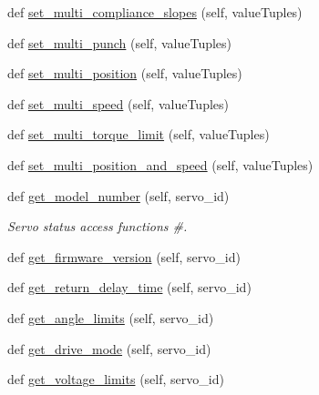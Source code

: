 \begin{DoxyCompactItemize}
def \hyperlink{classdynamixel__driver_1_1dynamixel__io_1_1_dynamixel_i_o_af3b2a4bd581266a9dd067a0c1f34687a}{set\+\_\+multi\+\_\+compliance\+\_\+slopes} (self, value\+Tuples)
\item 
def \hyperlink{classdynamixel__driver_1_1dynamixel__io_1_1_dynamixel_i_o_a113e6ff1c59d67480dc779fe7fa1ba52}{set\+\_\+multi\+\_\+punch} (self, value\+Tuples)
\item 
def \hyperlink{classdynamixel__driver_1_1dynamixel__io_1_1_dynamixel_i_o_aca2d90dab958dcc6d058c1eb6d7a6e11}{set\+\_\+multi\+\_\+position} (self, value\+Tuples)
\item 
def \hyperlink{classdynamixel__driver_1_1dynamixel__io_1_1_dynamixel_i_o_a8150f8a015df1441f348eb0a6c6ccaee}{set\+\_\+multi\+\_\+speed} (self, value\+Tuples)
\item 
def \hyperlink{classdynamixel__driver_1_1dynamixel__io_1_1_dynamixel_i_o_a1e05872bf62fd6726255c423219ca569}{set\+\_\+multi\+\_\+torque\+\_\+limit} (self, value\+Tuples)
\item 
def \hyperlink{classdynamixel__driver_1_1dynamixel__io_1_1_dynamixel_i_o_a124b89dc055f8f5ff807d8d976115529}{set\+\_\+multi\+\_\+position\+\_\+and\+\_\+speed} (self, value\+Tuples)
\item 
def \hyperlink{classdynamixel__driver_1_1dynamixel__io_1_1_dynamixel_i_o_a3f2d1b9ac285fb0490edfd2a4c7243c2}{get\+\_\+model\+\_\+number} (self, servo\+\_\+id)
\begin{DoxyCompactList}\small\item\em Servo status access functions \#. \end{DoxyCompactList}\item 
def \hyperlink{classdynamixel__driver_1_1dynamixel__io_1_1_dynamixel_i_o_a14d10031059c6c40dae76d3d9324a81c}{get\+\_\+firmware\+\_\+version} (self, servo\+\_\+id)
\item 
def \hyperlink{classdynamixel__driver_1_1dynamixel__io_1_1_dynamixel_i_o_a23eb8935d71b71c87fac075d8002abc1}{get\+\_\+return\+\_\+delay\+\_\+time} (self, servo\+\_\+id)
\item 
def \hyperlink{classdynamixel__driver_1_1dynamixel__io_1_1_dynamixel_i_o_af3a593697df035e17e287e3d401a8fe7}{get\+\_\+angle\+\_\+limits} (self, servo\+\_\+id)
\item 
def \hyperlink{classdynamixel__driver_1_1dynamixel__io_1_1_dynamixel_i_o_ad81c7f3da8654306f00f7ad9a2cbf54c}{get\+\_\+drive\+\_\+mode} (self, servo\+\_\+id)
\item 
def \hyperlink{classdynamixel__driver_1_1dynamixel__io_1_1_dynamixel_i_o_ab11d3c841d1e858f350c2c2e32f10ec3}{get\+\_\+voltage\+\_\+limits} (self, servo\+\_\+id)

\end{DoxyCompactItemize}
